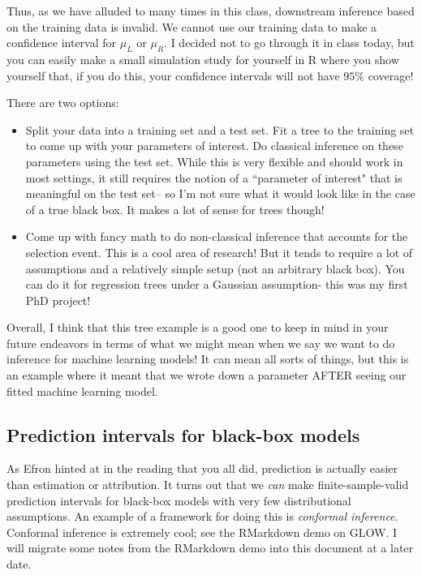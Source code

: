 Thus, as we have alluded to many times in this class, downstream inference based on the training data is invalid. We cannot use our training data to make a confidence interval for $\mu_L$ or $\mu_R$. I decided not to go through it in class today, but you can easily make a small simulation study for yourself in R where you show yourself that, if you do this, your confidence intervals will not have $95\%$ coverage! 

There are two options:
\begin{itemize}
\item Split your data into a training set and a test set. Fit a tree to the training set to come up with your parameters of interest. Do classical inference on these parameters using the test set. While this is very flexible and should work in most settings, it still requires the notion of a ``parameter of interest" that is meaningful on the test set-- so I'm not sure what it would look like in the case of a true black box. It makes a lot of sense for trees though! 
\item Come up with fancy math to do non-classical inference that accounts for the selection event. This is a cool area of research! But it tends to require a lot of assumptions and a relatively simple setup (not an arbitrary black box). You can do it for regression trees under a Gaussian assumption- this was my first PhD project! 
\end{itemize}

Overall, I think that this tree example is a good one to keep in mind in your future endeavors in terms of what we might mean when we say we want to do inference for machine learning models! It can mean all sorts of things, but this is an example where it meant that we wrote down a parameter AFTER seeing our fitted machine learning model. 

\subsection{Prediction intervals for black-box models}
 
 As Efron hinted at in the reading that you all did, prediction is actually easier than estimation or attribution. It turns out that we \emph{can} make finite-sample-valid prediction intervals for black-box models with very few distributional assumptions. An example of a framework for doing this is \emph{conformal inference}. Conformal inference is extremely cool; see the RMarkdown demo on GLOW. I will migrate some notes from the RMarkdown demo into this document at a later date. 


